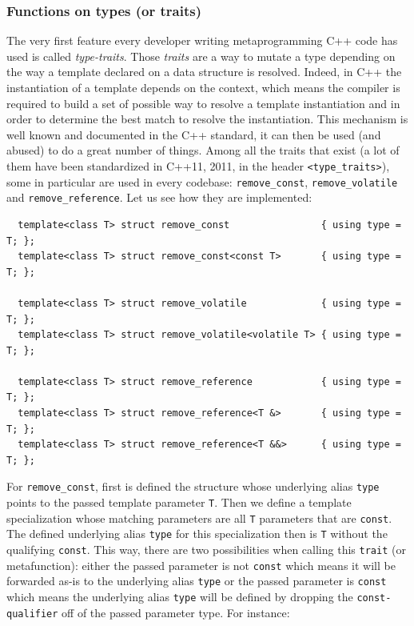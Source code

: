 \subsubsection{Functions on types (or traits)}

The very first feature every developer writing metaprogramming C++ code has used is called \emph{type-traits}. Those
\emph{traits} are a way to mutate a type depending on the way a template declared on a data structure is resolved.
Indeed, in C++ the instantiation of a template depends on the context, which means the compiler is required to build a
set of possible way to resolve a template instantiation and in order to determine the best match to resolve the
instantiation. This mechanism is well known and documented in the C++ standard, it can then be used (and abused) to do a
great number of things. Among all the traits that exist (a lot of them have been standardized in C++11, 2011, in the
header \texttt{<type\_traits>}), some in particular are used in every codebase: \texttt{remove\_const},
\texttt{remove\_volatile} and \texttt{remove\_reference}. Let us see how they are implemented:

\begin{verbatim}
  template<class T> struct remove_const                { using type = T; };
  template<class T> struct remove_const<const T>       { using type = T; };

  template<class T> struct remove_volatile             { using type = T; };
  template<class T> struct remove_volatile<volatile T> { using type = T; };

  template<class T> struct remove_reference            { using type = T; };
  template<class T> struct remove_reference<T &>       { using type = T; };
  template<class T> struct remove_reference<T &&>      { using type = T; };
\end{verbatim}

For \texttt{remove\_const}, first is defined the structure whose underlying alias \texttt{type} points to the passed
template parameter \texttt{T}. Then we define a template specialization whose matching parameters are all \texttt{T}
parameters that are \texttt{const}. The defined underlying alias \texttt{type} for this specialization then is
\texttt{T} without the qualifying \texttt{const}. This way, there are two possibilities when calling this \texttt{trait}
(or metafunction): either the passed parameter is not \texttt{const} which means it will be forwarded as-is to the
underlying alias \texttt{type} or the passed parameter is \texttt{const} which means the underlying alias \texttt{type}
will be defined by dropping the \texttt{const-qualifier} off of the passed parameter type. For instance:


